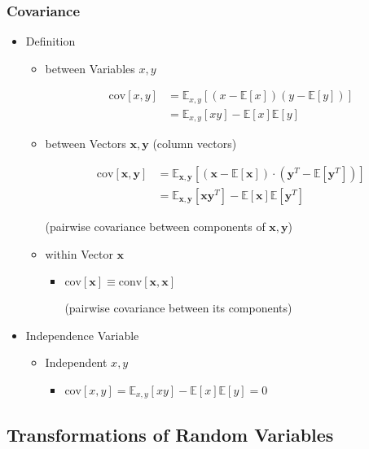 \subsubsection{Covariance}
\begin{itemize}
\item Definition
	\begin{itemize}
	\item between Variables $x,y$
		\begin{itemize}
		\Item \begin{align*} \text{cov}[x,y] &= \mathbb{E}_{x,y}[(x-\mathbb{E}[x])(y-\mathbb{E}[y])] \\ &= \mathbb{E}_{x,y}[xy] - \mathbb{E}[x]\mathbb{E}[y] \end{align*}
		\end{itemize}
	\item between Vectors $\mathbf x, \mathbf y$ (column vectors)
		\begin{itemize}
		\Item \begin{align*} \text{cov}[\mathbf x, \mathbf y] &= \mathbb{E}_{\mathbf x,\mathbf y}[(\mathbf x - \mathbb{E}[\mathbf x]) \cdot (\mathbf y^T -\mathbb{E}[\mathbf y^T])] \\ &= \mathbb{E}_{\mathbf x,\mathbf y}[\mathbf{xy}^T] - \mathbb{E}[\mathbf x]\mathbb E[\mathbf y^T] \end{align*}
		
		(pairwise covariance between components of $\mathbf x,\mathbf y$)
		\end{itemize}
	\item within Vector $\mathbf x$
		\begin{itemize}
		\item $\text{cov}[\mathbf x] \equiv \text{conv}[\mathbf x, \mathbf x]$ 
		
		(pairwise covariance between its components)
		\end{itemize}
	\end{itemize}
\item Independence Variable
	\begin{itemize}
	\item Independent $x,y$
		\begin{itemize}
		\item $\text{cov}[x,y] = \mathbb E_{x,y}[xy] -\mathbb{E}[x]\mathbb{E}[y] = 0$
		\end{itemize}
	\end{itemize}
\end{itemize}

\subsection{Transformations of Random Variables}

